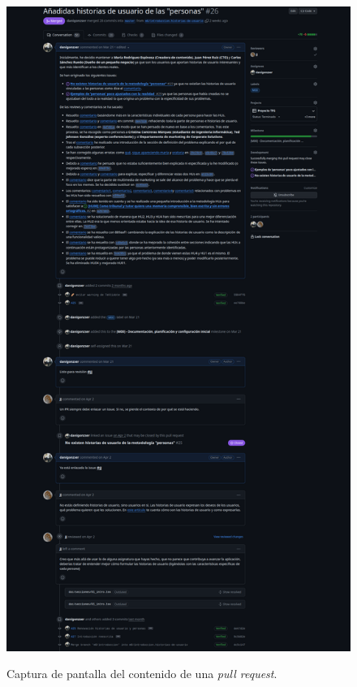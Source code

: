 \begin{figure}[H]
    \caption{Captura de pantalla del contenido de una \textit{pull request}.}
    \centering
    \vspace*{0.5cm}
    \includegraphics[scale=0.1]{figuras/pull_request_github.png}
    \label{fig:contenido_pull_request}
\end{figure}

